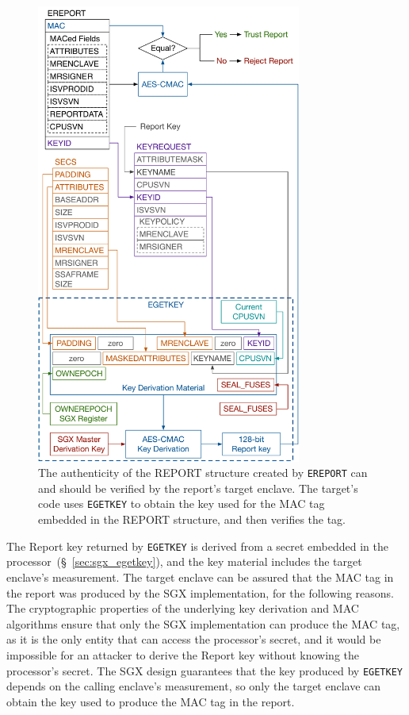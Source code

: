 \begin{figure}[hbt!]
  \centering
  \includegraphics[width=87mm]{figures/sgx_ereport_check.pdf}
  \caption{
    The authenticity of the REPORT structure created by \texttt{EREPORT} can
    and should be verified by the report's target enclave. The target's code
    uses \texttt{EGETKEY} to obtain the key used for the MAC tag embedded in
    the REPORT structure, and then verifies the tag.
  }
  \label{fig:sgx_ereport_check}
\end{figure}

The Report key returned by \texttt{EGETKEY} is derived from a secret embedded
in the processor~(\S~\ref{sec:sgx_egetkey}), and the key material includes the
target enclave's measurement. The target enclave can be assured that the MAC
tag in the report was produced by the SGX implementation, for the following
reasons. The cryptographic properties of the underlying key derivation and
MAC algorithms ensure that only the SGX implementation can produce the MAC tag,
as it is the only entity that can access the processor's secret, and it would
be impossible for an attacker to derive the Report key without knowing the
processor's secret. The SGX design guarantees that the key produced by
\texttt{EGETKEY} depends on the calling enclave's measurement, so only the
target enclave can obtain the key used to produce the MAC tag in the report.


